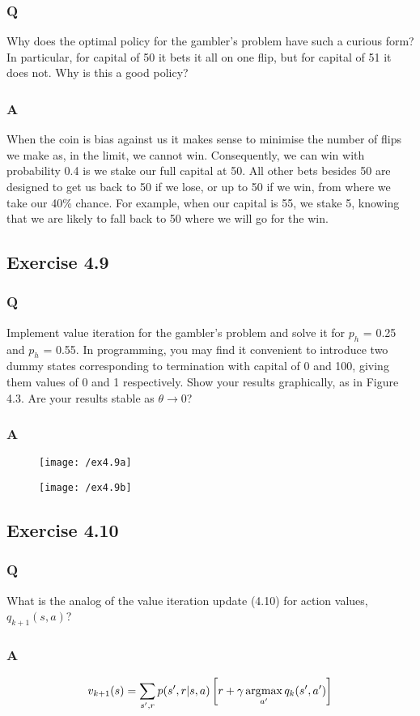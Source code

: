 \subsubsection{Q} Why does the optimal policy for the gambler’s problem have such a curious form? In particular, for capital of 50 it bets it all on one flip, but for capital of 51 it does not. Why is this a good policy?
\subsubsection{A}
When the coin is bias against us it makes sense to minimise the number of flips we make as, in the limit, we cannot win. Consequently, we can win with probability 0.4 is we stake our full capital at 50. All other bets besides 50 are designed to get us back to 50 if we lose, or up to 50 if we win, from where we take our 40\% chance. For example, when our capital is 55, we stake 5, knowing that we are likely to fall back to 50 where we will go for the win.

\subsection{Exercise 4.9}
\subsubsection{Q} Implement value iteration for the gambler’s problem and solve it for $p_h$ = 0.25 and $p_h$ = 0.55. In programming, you may find it convenient to introduce two dummy states corresponding to termination with capital of 0 and 100, giving them values of 0 and 1 respectively. Show your results graphically, as in Figure 4.3. Are your results stable as $\theta \rightarrow 0$?
\subsubsection{A}
\ProgrammingExercise

\begin{figure}[h!]
	\centering
	\texttt{[image: /ex4.9a]}
	\label{fig:4.9a}
\end{figure}

\begin{figure}[h!]
	\centering
	\texttt{[image: /ex4.9b]}
	\label{fig:4.9b}
\end{figure}

\subsection{Exercise 4.10}
\subsubsection{Q} What is the analog of the value iteration update (4.10) for action values, $q_{k+1}(s, a)$?
\subsubsection{A}
\begin{equation}
v_{k+1}(s) =  \sum_{s',r} p(s', r |s, a)\left[r + \gamma \operatorname*{\arg\!\max}_{a'} q_k(s', a')\right]
\end{equation}
